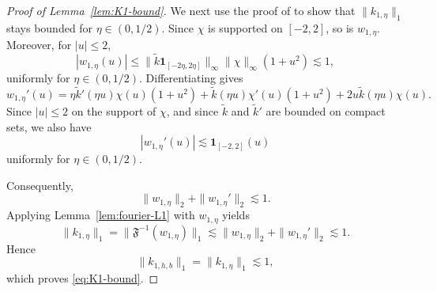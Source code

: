 \documentclass[english, 11pt]{article}
\newcommand{\FT}[1]{\widetilde{#1}}
\theoremstyle{plain}
\theoremstyle{definition}
\theoremstyle{remark}
\begin{document}
\begin{appendix}
\begin{proof}[Proof of Lemma~\ref{lem:K1-bound}]
We next use the proof of \cite[Lemma S1.1]{rousseau2024wasserstein} to show that $\|k_{1,\eta}\|_1$ stays bounded for $\eta \in (0,1/2)$.
Since $\chi$ is supported on $[-2,2]$, so is $w_{1,\eta}$. Moreover, for $|u|\le 2$,
\begin{equation*}
|w_{1,\eta}(u)|\le\|\FT{k}\mathbf{1}_{[-2\eta,2\eta]}\|_{\infty} \|\chi\|_\infty (1+u^2)
\lesssim 1,
\end{equation*}
uniformly for $\eta\in(0,1/2)$. Differentiating gives
\begin{equation*}
w_{1,\eta}'(u) = \eta \FT{k}'(\eta u)\chi(u)(1+u^2) + \FT{k}(\eta u)\chi'(u)(1+u^2) + 2u \FT{k}(\eta u)\chi(u).
\end{equation*}
Since $|u|\le 2$ on the support of $\chi$, and since $\FT{k}$ and $\FT{k}'$ are bounded on compact sets, we also have
\begin{equation*}
|w_{1,\eta}'(u)|\lesssim \mathbf{1}_{[-2,2]}(u)
\end{equation*}
uniformly for $\eta\in(0,1/2)$.

Consequently,
\begin{equation*}
\|w_{1,\eta}\|_2+\|w_{1,\eta}'\|_2\lesssim 1.
\end{equation*}
Applying Lemma~\ref{lem:fourier-L1} with $w_{1,\eta}$ yields
\begin{equation*}
\|k_{1,\eta}\|_1 = \|\mathfrak F^{-1}(w_{1,\eta})\|_1\lesssim \|w_{1,\eta}\|_2+\|w_{1,\eta}'\|_2 \lesssim 1.
\end{equation*}
Hence
\begin{equation*}
\|k_{1,h,b}\|_1=\|k_{1,\eta}\|_1\lesssim 1,
\end{equation*}
which proves \eqref{eq:K1-bound}.
\end{proof}

\restatehighfreq*


\end{appendix}
\end{document}
